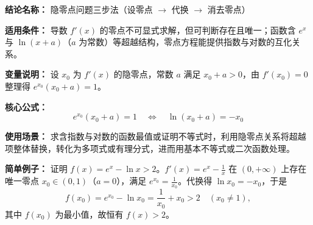 \textbf{结论名称：} 隐零点问题三步法（设零点 $\to$ 代换 $\to$ 消去零点）

\textbf{适用条件：} 导数 $f'(x)$ 的零点不可显式求解，但可判断存在且唯一；函数含 $e^x$ 与 $\ln(x+a)$（$a$ 为常数）等超越结构，零点方程能提供指数与对数的互化关系。

\textbf{变量说明：} 设 $x_0$ 为 $f'(x)$ 的隐零点，常数 $a$ 满足 $x_0+a>0$，由 $f'(x_0)=0$ 整理得 $e^{x_0}(x_0+a)=1$。

\textbf{核心公式：}
\[
\boxed{ e^{x_0}(x_0+a)=1 \quad\Longleftrightarrow\quad \ln(x_0+a)=-x_0 }
\]

\textbf{使用场景：} 求含指数与对数的函数最值或证明不等式时，利用隐零点关系将超越项整体替换，转化为多项式或有理分式，进而用基本不等式或二次函数处理。

\textbf{简单例子：} 证明 $f(x)=e^x-\ln x>2$。$f'(x)=e^x-\frac{1}{x}$ 在 $(0,+\infty)$ 上存在唯一零点 $x_0\in(0,1)$（$a=0$），满足 $e^{x_0}=\frac{1}{x_0}$。代换得 $\ln x_0=-x_0$，于是
\[
f(x_0)=e^{x_0}-\ln x_0=\frac{1}{x_0}+x_0>2\quad (x_0\neq 1),
\]
其中 $f(x_0)$ 为最小值，故恒有 $f(x)>2$。